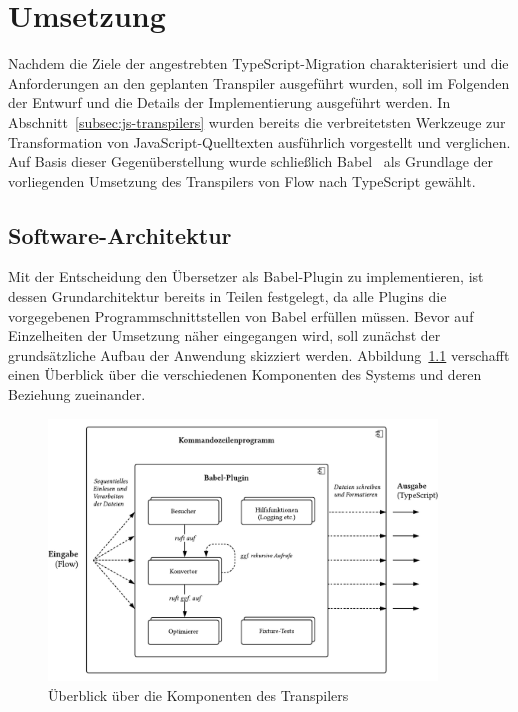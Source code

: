 \chapter{Umsetzung}
\label{chap:implementation}

Nachdem die Ziele der angestrebten TypeScript-Migration charakterisiert und die Anforderungen an den geplanten Transpiler ausgeführt wurden, soll im Folgenden der Entwurf und die Details der Implementierung ausgeführt werden. In Abschnitt~\ref{subsec:js-transpilers} wurden bereits die verbreitetsten Werkzeuge zur Transformation von JavaScript-Quelltexten ausführlich vorgestellt und verglichen. Auf Basis dieser Gegenüberstellung wurde schließlich Babel~\autocite{BABEL} als Grundlage der vorliegenden Umsetzung des Transpilers von Flow nach TypeScript gewählt.

\section{Software-Architektur}
\label{sec:software-architecture}

Mit der Entscheidung den Übersetzer als Babel-Plugin zu implementieren, ist dessen Grundarchitektur bereits in Teilen festgelegt, da alle Plugins die vorgegebenen Programmschnittstellen von Babel erfüllen müssen. Bevor auf Einzelheiten der Umsetzung näher eingegangen wird, soll zunächst der grundsätzliche Aufbau der Anwendung skizziert werden. Abbildung~\ref{fig:architecture-overview} verschafft einen Überblick über die verschiedenen Komponenten des Systems und deren Beziehung zueinander.

\begin{figure}[tbp]
  \centering
  \includegraphics[width=0.92\textwidth]{src/4_Umsetzung/fig/architecture-overview.pdf}
	\caption{Überblick über die Komponenten des Transpilers}
	\label{fig:architecture-overview}
\end{figure}

